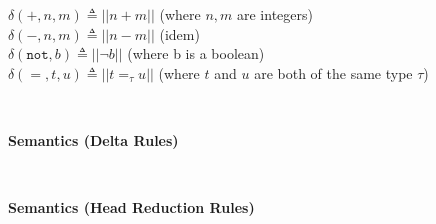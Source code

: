 \begin{figure}[H]
	\hrulefill
	\begin{spacing}{1.1} 

 $\delta(+, n, m) \triangleq ||n + m||$ 
 	(where $n,m$ are integers)\\
 $\delta(-, n, m) \triangleq  ||n - m||$ 
 	(idem)\\
 $\delta(\mathtt{not}, b) \triangleq  ||\neg b||$ 
 	(where b is a boolean)\\
 $\delta(\mathtt{=}, t, u) \triangleq ||t =_{\tau} u||$ 
 	(where $t$ and $u$ are both of the same type $\tau$)\\
	\end{spacing}
	\caption{ \textbf{\gml Semantics (Delta Rules)} \hfill}
	\hrulefill	\\
\end{figure}


\begin{figure}[H]
	\hrulefill
	\begin{spacing}{1.1} 
	
	
	  

	
	
	



	
\end{spacing}
\caption{ \textbf{\gml Semantics (Head Reduction Rules)} \hfill}
\hrulefill	\\
\end{figure}
	
